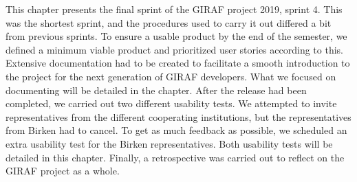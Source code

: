This chapter presents the final sprint of the GIRAF project 2019, sprint 4.
This was the shortest sprint, and the procedures used to carry it out differed a bit from previous sprints.
To ensure a usable product by the end of the semester, we defined a minimum viable product and prioritized user stories according to this.
Extensive documentation had to be created to facilitate a smooth introduction to the project for the next generation of GIRAF developers.
What we focused on documenting will be detailed in the chapter. 
After the release had been completed, we carried out two different usability tests.
We attempted to invite representatives from the different cooperating institutions, but the representatives from Birken had to cancel.
To get as much feedback as possible, we scheduled an extra usability test for the Birken representatives.
Both usability tests will be detailed in this chapter. 
Finally, a retrospective was carried out to reflect on the GIRAF project as a whole.
